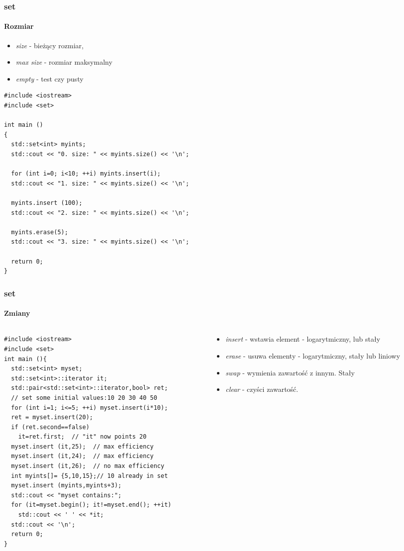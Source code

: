 \documentclass[10pt]{beamer}
\begin{document}
\begin{frame}[fragile]
  \frametitle{set}
  \framesubtitle{Rozmiar}
  \begin{itemize} 
    \item \textit{size} - bieżący rozmiar,
    \item \textit{max size} - rozmiar maksymalny
    \item \textit{empty} - test czy pusty
  \end{itemize}
  \begin{lstlisting}
#include <iostream>
#include <set>

int main ()
{
  std::set<int> myints;
  std::cout << "0. size: " << myints.size() << '\n';

  for (int i=0; i<10; ++i) myints.insert(i);
  std::cout << "1. size: " << myints.size() << '\n';

  myints.insert (100);
  std::cout << "2. size: " << myints.size() << '\n';

  myints.erase(5);
  std::cout << "3. size: " << myints.size() << '\n';

  return 0;
}
\end{lstlisting}
\end{frame}

\begin{frame}[fragile]
  \frametitle{set}
  \framesubtitle{Zmiany}
  \begin{columns}
    \begin{column}{0.7\textwidth}
\begin{lstlisting}
#include <iostream>
#include <set>
int main (){
  std::set<int> myset;
  std::set<int>::iterator it;
  std::pair<std::set<int>::iterator,bool> ret;
  // set some initial values:10 20 30 40 50
  for (int i=1; i<=5; ++i) myset.insert(i*10);
  ret = myset.insert(20);
  if (ret.second==false)
    it=ret.first;  // "it" now points 20
  myset.insert (it,25);  // max efficiency
  myset.insert (it,24);  // max efficiency
  myset.insert (it,26);  // no max efficiency
  int myints[]= {5,10,15};// 10 already in set
  myset.insert (myints,myints+3);
  std::cout << "myset contains:";
  for (it=myset.begin(); it!=myset.end(); ++it)
    std::cout << ' ' << *it;
  std::cout << '\n';
  return 0;
}
\end{lstlisting}
    \end{column}
    \begin{column}{0.4\textwidth}
  \begin{itemize}
    \item \textit{insert} - wstawia element - logarytmiczny, lub stały
    \item \textit{erase} - usuwa elementy - logarytmiczny, stały lub liniowy
    \item \textit{swap} - wymienia zawartość z innym. Stały
    \item \textit{clear} - czyści zawartość.
  \end{itemize}
    \end{column}
  \end{columns}

\end{frame}
\end{document}
